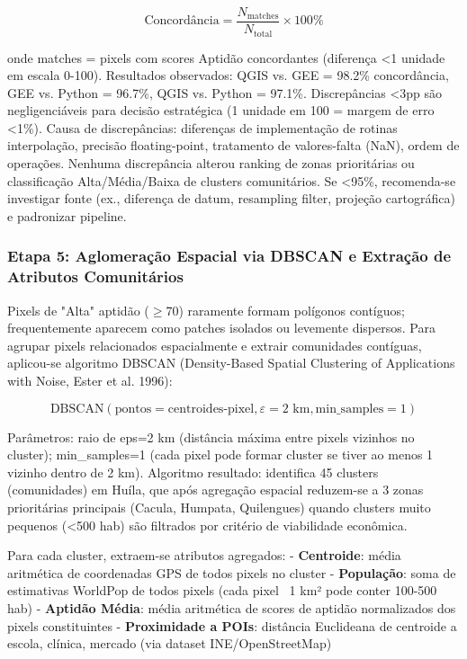 \documentclass[12pt, a4paper]{article}
\begin{document}
\begin{equation}
\text{Concordância} = \frac{N_{\text{matches}}}{N_{\text{total}}} \times 100\%
\end{equation}

onde matches = pixels com scores Aptidão concordantes (diferença <1 unidade em escala 0-100). Resultados observados: QGIS vs. GEE = 98.2\% concordância, GEE vs. Python = 96.7\%, QGIS vs. Python = 97.1\%. Discrepâncias <3pp são negligenciáveis para decisão estratégica (1 unidade em 100 = margem de erro <1\%). Causa de discrepâncias: diferenças de implementação de rotinas interpolação, precisão floating-point, tratamento de valores-falta (NaN), ordem de operações. Nenhuma discrepância alterou ranking de zonas prioritárias ou classificação Alta/Média/Baixa de clusters comunitários. Se <95\%, recomenda-se investigar fonte (ex., diferença de datum, resampling filter, projeção cartográfica) e padronizar pipeline.

\subsubsection{Etapa 5: Aglomeração Espacial via DBSCAN e Extração de Atributos Comunitários}

Pixels de "Alta" aptidão ($\geq$70) raramente formam polígonos contíguos; frequentemente aparecem como patches isolados ou levemente dispersos. Para agrupar pixels relacionados espacialmente e extrair comunidades contíguas, aplicou-se algoritmo DBSCAN (Density-Based Spatial Clustering of Applications with Noise, Ester et al. 1996):

\begin{equation}
\text{DBSCAN}(\text{pontos} = \text{centroides-pixel}, \varepsilon = 2 \text{ km}, \text{min\_samples} = 1)
\end{equation}

Parâmetros: raio de eps=2 km (distância máxima entre pixels vizinhos no cluster); min_samples=1 (cada pixel pode formar cluster se tiver ao menos 1 vizinho dentro de 2 km). Algoritmo resultado: identifica 45 clusters (comunidades) em Huíla, que após agregação espacial reduzem-se a 3 zonas prioritárias principais (Cacula, Humpata, Quilengues) quando clusters muito pequenos (<500 hab) são filtrados por critério de viabilidade econômica.

Para cada cluster, extraem-se atributos agregados:
- \textbf{Centroide}: média aritmética de coordenadas GPS de todos pixels no cluster
- \textbf{População}: soma de estimativas WorldPop de todos pixels (cada pixel ~1 km² pode conter 100-500 hab)
- \textbf{Aptidão Média}: média aritmética de scores de aptidão normalizados dos pixels constituintes
- \textbf{Proximidade a POIs}: distância Euclideana de centroide a escola, clínica, mercado (via dataset INE/OpenStreetMap)
\end{document}
